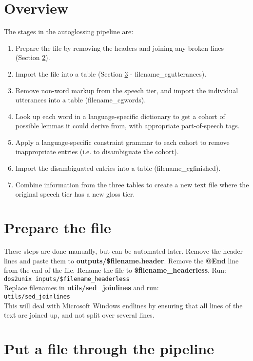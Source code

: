 \documentclass[a4paper,10pt]{article}
\begin{document}
\section{Overview}
\label{sec:overview}

The stages in the autoglossing pipeline are:
\begin{enumerate}
\item Prepare the file by removing the headers and joining any broken lines (Section \ref{sec:prepare}).
\item Import the file into a table (Section \ref{sec:pipeline} - filename\_cgutterances).
\item Remove non-word markup from the speech tier, and import the individual utterances into a table (filename\_cgwords).
\item Look up each word in a language-specific dictionary to get a cohort of possible lemmas it could derive from, with appropriate part-of-speech tags.
\item Apply a language-specific constraint grammar to each cohort to remove inappropriate entries (i.e. to disambiguate the cohort).
\item Import the disambiguated entries into a table (filename\_cgfinished).
\item Combine information from the three tables to create a new text file where the original speech tier has a new gloss tier.
\end{enumerate}


\section{Prepare the file}
\label{sec:prepare}

These steps are done manually, but can be automated later.  Remove the header lines and paste them to \textbf{outputs/\$filename.header}.  Remove the \textbf{@End} line from the end of the file.  Rename the file to \textbf{\$filename\_headerless}.  Run: \\
\verb|dos2unix inputs/$filename_headerless|\\
Replace filenames in \textbf{utils/sed\_joinlines} and run:\\
\verb|utils/sed_joinlines|\\
This will deal with Microsoft Windows endlines by ensuring that all lines of the text are joined up, and not split over several lines.


\section{Put a file through the pipeline}
\label{sec:pipeline}
\end{document}
